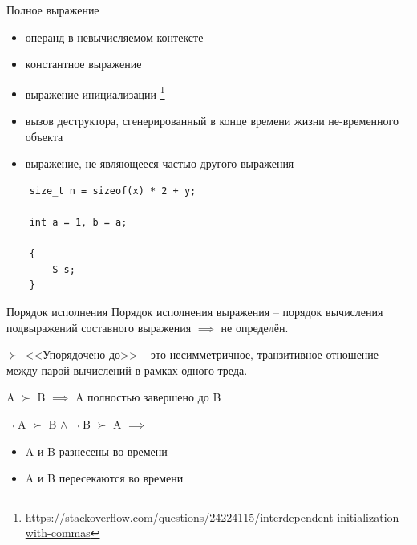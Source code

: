 \documentclass[unknownkeysallowed,xcolor=table]{beamer}
\begin{document}
\begin{frame}[fragile]{Полное выражение}
  \begin{itemize}
    \item операнд в невычисляемом контексте \vspace{0.5em}
    \item константное выражение \vspace{0.5em}
    \item выражение инициализации \footnote{\url{https://stackoverflow.com/questions/24224115/interdependent-initialization-with-commas}} \vspace{0.5em}
    \item вызов деструктора, сгенерированный в конце времени жизни не-временного объекта \vspace{0.5em}
    \item выражение, не являющееся частью другого выражения
  \end{itemize}
  \begin{lstlisting}
    size_t n = sizeof(x) * 2 + y;

    int a = 1, b = a;

    {
        S s;
    }
  \end{lstlisting}
\end{frame}

\begin{frame}{Порядок исполнения}
  Порядок исполнения выражения -- порядок вычисления подвыражений составного выражения $\implies$ не определён.
  
  \vspace{1.5em}
  
  $\succ$ <<Упорядочено до>> -- это несимметричное, транзитивное отношение между парой вычислений в рамках одного треда.
  
  \vspace{2em}
  
  A $\succ$ B $\implies$ A полностью завершено до B
  
  \vspace{1.5em}
  
  $\neg$ A $\succ$ B $\land$ $\neg$ B $\succ$ A $\implies$
  \begin{itemize}
    \item A и B разнесены во времени \vspace{0.5em}
    \item A и B пересекаются во времени
  \end{itemize}
\end{frame}
\end{document}
